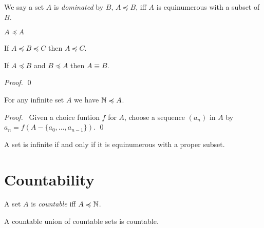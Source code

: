 \begin{definition}
    We say a set $A$ is \emph{dominated} by $B$, $A \preccurlyeq B$, iff
    $A$ is equinumerous with a subset of $B$.
\end{definition}

\begin{theorem}
    $A \preccurlyeq A$
\end{theorem}

\begin{theorem}
    If $A \preccurlyeq B \preccurlyeq C$ then $A \preccurlyeq C$.
\end{theorem}

\begin{theorem}
    If $A \preccurlyeq B$ and $B \preccurlyeq A$ then $A \equiv B$.
\end{theorem}

\begin{proof}
    \pf
    \qed
\end{proof}

\begin{theorem}[AC]
    For any infinite set $A$ we have $\mathbb{N} \preccurlyeq A$.
\end{theorem}

\begin{proof}
    \pf\ Given a choice funtion $f$ for $A$, choose a sequence $(a_n)$ in $A$
    by $a_n = f(A - \{ a_0, \ldots, a_{n-1} \})$. \qed
\end{proof}

\begin{corollary}[AC]
    A set is infinite if and only if it is equinumerous with a proper subset.
\end{corollary}

\section{Countability}

\begin{definition}[Countable]
    A set $A$ is \emph{countable} iff $A \preccurlyeq \mathbb{N}$.
\end{definition}

\begin{theorem}[AC]
    A countable union of countable sets is countable.
\end{theorem}